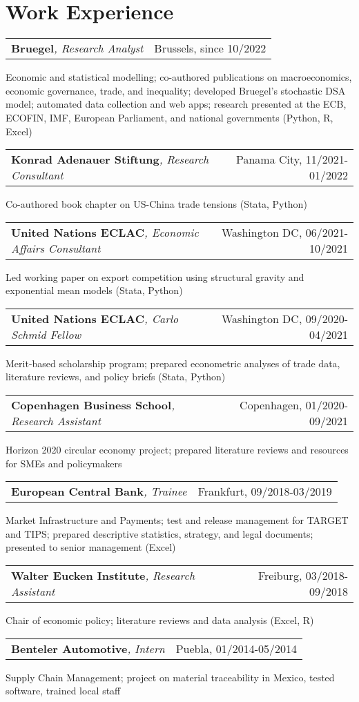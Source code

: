 \documentclass[A4,11pt]{article}
\makeatletter
\newcommand{\Subheading}[4]{   
    \begin{tabular*}{\textwidth}[t]{@{}l @{\extracolsep{\fill}} r@{}}
        \textbf{#1}\textit{\small #2} & \footnotesize #3 \\
    \end{tabular*}
    \small #4 
    \vspace{7pt}
}
\makeatother
\begin{document}
\section{Work Experience}

    \Subheading
        {Bruegel}{, Research Analyst}{Brussels, since 10/2022}
        {Economic and statistical modelling; co-authored publications on macroeconomics, 
        economic governance, trade, and inequality; 
        developed Bruegel's stochastic DSA model; 
        automated data collection and web apps;
        research presented at the ECB, ECOFIN, IMF, European Parliament, and national governments 
        (Python, R, Excel)}

    \Subheading
        {Konrad Adenauer Stiftung}{, Research Consultant}{Panama City, 11/2021-01/2022}
        {Co-authored book chapter on US-China trade tensions 
        (Stata, Python)}  

    \Subheading
        {United Nations ECLAC}{, Economic Affairs Consultant}{Washington DC, 06/2021-10/2021}
        {Led working paper on export competition using structural gravity 
        and exponential mean models (Stata, Python)}

    \Subheading
        {United Nations ECLAC}{, Carlo Schmid Fellow}{Washington DC, 09/2020-04/2021}
        {Merit-based scholarship program; prepared econometric analyses of trade data, 
        literature reviews, and policy briefs (Stata, Python)}

    \Subheading
        {Copenhagen Business School}{, Research Assistant}{Copenhagen, 01/2020-09/2021}
        {Horizon 2020 circular economy project; prepared literature reviews and 
        resources for SMEs and policymakers}

    \Subheading
        {European Central Bank}{, Trainee}{Frankfurt, 09/2018-03/2019}
        {Market Infrastructure and Payments; test and release management for TARGET 
        and TIPS; prepared descriptive statistics, strategy, and legal documents;
        presented to senior management (Excel)}

    \Subheading
        {Walter Eucken Institute}{, Research Assistant}{Freiburg, 03/2018-09/2018}
        {Chair of economic policy; literature reviews and data analysis (Excel, R)}

    \Subheading
        {Benteler Automotive}{, Intern}{Puebla, 01/2014-05/2014}
        {Supply Chain Management; project on material traceability in Mexico, tested software, 
        trained local staff}
\end{document}
